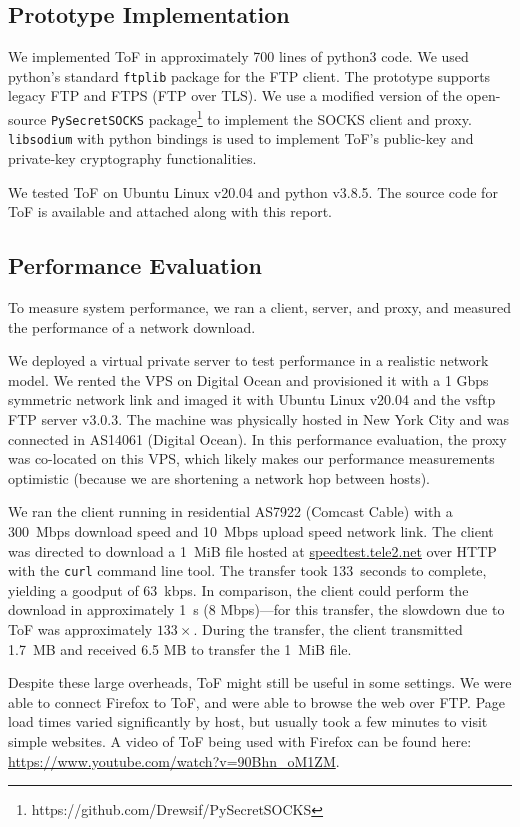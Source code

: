 \documentclass[letterpaper,twocolumn,11pt]{article}
\begin{document}
\subsection{Prototype Implementation} \label{subsec:impl}

We implemented ToF in approximately 700 lines of python3 code. We used python's
standard \texttt{ftplib} package for the FTP client. The prototype supports
legacy FTP and FTPS (FTP over TLS). We use a modified version of the
open-source \texttt{PySecretSOCKS}
package\footnote{https://github.com/Drewsif/PySecretSOCKS} to implement the
SOCKS client and proxy. \texttt{libsodium} with python bindings is used to
implement ToF's public-key and private-key cryptography functionalities.

We tested ToF on Ubuntu Linux v20.04 and python v3.8.5. The source code for ToF
is available and attached along with this report.

\subsection{Performance Evaluation} \label{subsec:eval}

To measure system performance, we ran a client, server, and proxy, and measured
the performance of a network download.

We deployed a virtual private server to test performance in a realistic network
model. We rented the VPS on Digital Ocean and provisioned it with a 1 Gbps
symmetric network link and imaged it with Ubuntu Linux v20.04 and the vsftp FTP
server v3.0.3. The machine was physically hosted in New York City and was
connected in AS14061 (Digital Ocean). In this performance evaluation, the proxy
was co-located on this VPS, which likely makes our performance measurements
optimistic (because we are shortening a network hop between hosts).

We ran the client running in residential AS7922 (Comcast Cable) with a 300~Mbps
download speed and 10~Mbps upload speed network link. The client was directed
to download a 1~MiB file hosted at \url{speedtest.tele2.net} over HTTP with the
\texttt{curl} command line tool. The transfer took 133~seconds to complete,
yielding a goodput of 63~kbps. In comparison, the client could perform the
download in approximately 1~s (8 Mbps)---for this transfer, the slowdown due to
ToF was approximately $133\times$. During the transfer, the client transmitted
1.7~MB and received 6.5 MB to transfer the 1~MiB file.

Despite these large overheads, ToF might still be useful in some settings. We
were able to connect Firefox to ToF, and were able to browse the web over FTP.
Page load times varied significantly by host, but usually took a few minutes
to visit simple websites. A video of ToF being used with Firefox can be found
here: \url{https://www.youtube.com/watch?v=90Bhn_oM1ZM}.
\end{document}
